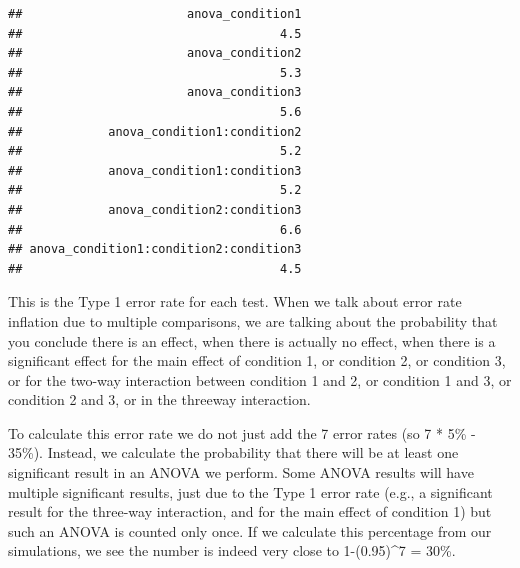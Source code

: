\documentclass[]{book}
\newenvironment{Shaded}{\begin{snugshade}}{\end{snugshade}}
\newcommand{\ControlFlowTok}[1]{\textcolor[rgb]{0.13,0.29,0.53}{\textbf{#1}}}
\newcommand{\DecValTok}[1]{\textcolor[rgb]{0.00,0.00,0.81}{#1}}
\newcommand{\FloatTok}[1]{\textcolor[rgb]{0.00,0.00,0.81}{#1}}
\newcommand{\KeywordTok}[1]{\textcolor[rgb]{0.13,0.29,0.53}{\textbf{#1}}}
\newcommand{\NormalTok}[1]{#1}
\newcommand{\OperatorTok}[1]{\textcolor[rgb]{0.81,0.36,0.00}{\textbf{#1}}}
\newcommand{\StringTok}[1]{\textcolor[rgb]{0.31,0.60,0.02}{#1}}
\begin{document}
\begin{Shaded}
\end{Shaded}

\begin{verbatim}
##                       anova_condition1 
##                                    4.5 
##                       anova_condition2 
##                                    5.3 
##                       anova_condition3 
##                                    5.6 
##            anova_condition1:condition2 
##                                    5.2 
##            anova_condition1:condition3 
##                                    5.2 
##            anova_condition2:condition3 
##                                    6.6 
## anova_condition1:condition2:condition3 
##                                    4.5
\end{verbatim}

This is the Type 1 error rate for each test. When we talk about error rate inflation due to multiple comparisons, we are talking about the probability that you conclude there is an effect, when there is actually no effect, when there is a significant effect for the main effect of condition 1, or condition 2, or condition 3, or for the two-way interaction between condition 1 and 2, or condition 1 and 3, or condition 2 and 3, or in the threeway interaction.

To calculate this error rate we do not just add the 7 error rates (so 7 * 5\% - 35\%). Instead, we calculate the probability that there will be at least one significant result in an ANOVA we perform. Some ANOVA results will have multiple significant results, just due to the Type 1 error rate (e.g., a significant result for the three-way interaction, and for the main effect of condition 1) but such an ANOVA is counted only once. If we calculate this percentage from our simulations, we see the number is indeed very close to 1-(0.95)\^{}7 = 30\%.
\end{document}
